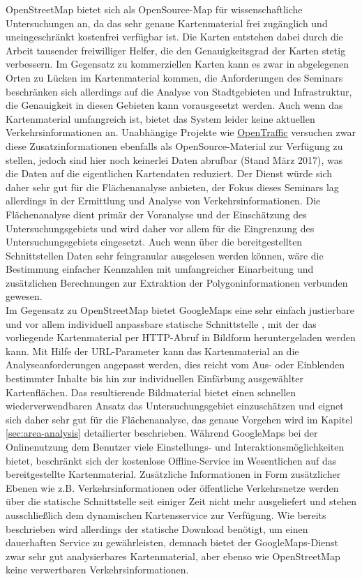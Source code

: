 OpenStreetMap bietet sich als OpenSource-Map für wissenschaftliche Untersuchungen an, da das sehr genaue Kartenmaterial frei zugänglich und uneingeschränkt kostenfrei verfügbar ist. Die Karten entstehen dabei durch die Arbeit tausender freiwilliger Helfer, die den Genauigkeitsgrad der Karten stetig verbessern. Im Gegensatz zu kommerziellen Karten kann es zwar in abgelegenen Orten zu Lücken im Kartenmaterial kommen, die Anforderungen des Seminars beschränken sich allerdings auf die Analyse von Stadtgebieten und Infrastruktur, die Genauigkeit in diesen Gebieten kann vorausgesetzt werden. Auch wenn das Kartenmaterial umfangreich ist, bietet das System leider keine aktuellen Verkehrsinformationen an. Unabhängige Projekte wie \href{http://opentraffic.io/}{OpenTraffic} versuchen zwar diese Zusatzinformationen ebenfalls als OpenSource-Material zur Verfügung zu stellen, jedoch sind hier noch keinerlei Daten abrufbar (Stand März 2017), was die Daten auf die eigentlichen Kartendaten reduziert. Der Dienst würde sich daher sehr gut für die Flächenanalyse anbieten, der Fokus dieses Seminars lag allerdings in der Ermittlung und Analyse von  Verkehrsinformationen. Die Flächenanalyse dient primär der Voranalyse und der Einschätzung des Untersuchungsgebiets und wird daher vor allem für die Eingrenzung des Untersuchungsgebiets eingesetzt. Auch wenn über die bereitgestellten Schnittstellen Daten sehr feingranular ausgelesen werden können, wäre die Bestimmung einfacher Kennzahlen mit umfangreicher Einarbeitung und zusätzlichen Berechnungen zur Extraktion der Polygoninformationen verbunden gewesen.\\

Im Gegensatz zu OpenStreetMap bietet GoogleMaps eine sehr einfach justierbare und vor allem individuell anpassbare statische Schnittstelle \cite{googlestaticmap}, mit der das vorliegende Kartenmaterial per HTTP-Abruf in Bildform heruntergeladen werden kann. Mit Hilfe der URL-Parameter kann das Kartenmaterial an die Analyseanforderungen angepasst werden, dies reicht vom Aus- oder Einblenden bestimmter Inhalte bis hin zur individuellen Einfärbung ausgewählter Kartenflächen. Das resultierende Bildmaterial bietet einen schnellen wiederverwendbaren Ansatz das Untersuchungsgebiet einzuschätzen und eignet sich daher sehr gut für die Flächenanalyse, das genaue Vorgehen wird im Kapitel \ref{sec:area-analysis} detailierter beschrieben. Während GoogleMaps bei der Onlinenutzung dem Benutzer viele Einstellungs- und Interaktionsmöglichkeiten bietet, beschränkt sich der kostenlose Offline-Service im Wesentlichen auf das bereitgestellte Kartenmaterial. Zusätzliche Informationen in Form zusätzlicher Ebenen wie z.B. Verkehrsinformationen oder öffentliche Verkehrsnetze werden über die statische Schnittstelle seit einiger Zeit nicht mehr ausgeliefert und stehen ausschließlich dem dynamischen Kartensservice zur Verfügung. Wie bereits beschrieben wird allerdings der statische Download benötigt, um einen dauerhaften Service zu gewährleisten, demnach bietet der GoogleMaps-Dienst zwar sehr gut analysierbares Kartenmaterial, aber ebenso wie OpenStreetMap keine verwertbaren Verkehrsinformationen.\\

